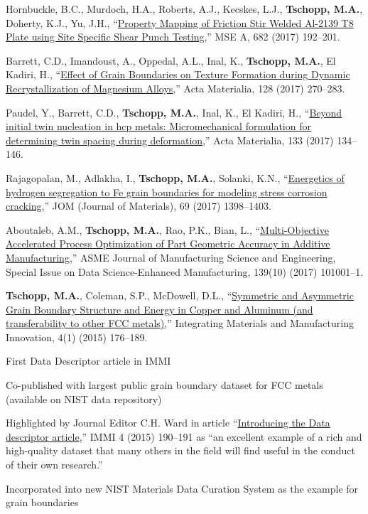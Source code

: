\begin{cvlist}
\item
Hornbuckle, B.C., Murdoch, H.A., Roberts, A.J., Kecskes, L.J., \textbf{Tschopp, M.A.}, Doherty, K.J., Yu, J.H., ``\href{http://dx.doi.org/10.1016/j.msea.2016.11.032}{Property Mapping of Friction Stir Welded Al-2139 T8 Plate using Site Specific Shear Punch Testing},'' MSE A, 682 (2017) 192--201.

\item
{Barrett, C.D.}, {Imandoust, A.}, Oppedal, A.L., Inal, K., \textbf{Tschopp, M.A.}, El Kadiri, H., ``\href{http://dx.doi.org/10.1016/j.actamat.2017.01.063}{Effect of Grain Boundaries on Texture Formation during Dynamic Recrystallization of Magnesium Alloys},'' Acta Materialia, 128 (2017) 270--283.

\item
{Paudel, Y.}, {Barrett, C.D.}, \textbf{Tschopp, M.A.}, Inal, K., El Kadiri, H., ``\href{https://doi.org/10.1016/j.actamat.2017.05.013}{Beyond initial twin nucleation in hcp metals: Micromechanical formulation for determining twin spacing during deformation},'' Acta Materialia, 133 (2017) 134--146.

\item
{Rajagopalan, M.}, {Adlakha, I.},  \textbf{Tschopp, M.A.}, Solanki, K.N., ``\href{https://doi.org/10.1007/s11837-017-2386-7}{Energetics of hydrogen segregation to Fe grain boundaries for modeling stress corrosion cracking},'' JOM (Journal of Materials), 69 (2017) 1398--1403. 

\item
{Aboutaleb, A.M.}, \textbf{Tschopp, M.A.}, Rao, P.K., Bian, L., ``\href{http://manufacturingscience.asmedigitalcollection.asme.org/article.aspx?articleid=2645865}{Multi-Objective Accelerated Process Optimization of Part Geometric Accuracy in Additive Manufacturing},'' ASME Journal of Manufacturing Science and Engineering, Special Issue on Data Science-Enhanced Manufacturing, 139(10) (2017) 101001--1.

\item
\textbf{Tschopp, M.A.}, {Coleman, S.P.}, McDowell, D.L., ``\href{http://dx.doi.org/10.1186/s40192-015-0040-1}{Symmetric and Asymmetric Grain Boundary Structure and Energy in Copper and Aluminum (and transferability to other FCC metals)},'' Integrating Materials and Manufacturing Innovation, 4(1) (2015) 176--189.
\begin{list2}
\item[$\star$] First Data Descriptor article in IMMI
\item[$\star$] Co-published with largest public grain boundary dataset for FCC metals (available on NIST data repository)
\item[$\star$] Highlighted by Journal Editor C.H. Ward in article ``\href{https://doi.org/10.1186/s40192-015-0041-0}{Introducing the Data descriptor article},'' IMMI 4 (2015) 190--191 as ``an excellent example of a rich and high-quality dataset that many others in the field will find useful in the conduct of their own research.''
\item[$\star$] Incorporated into new NIST Materials Data Curation System as the example for grain boundaries
\end{list2}


\end{cvlist}
